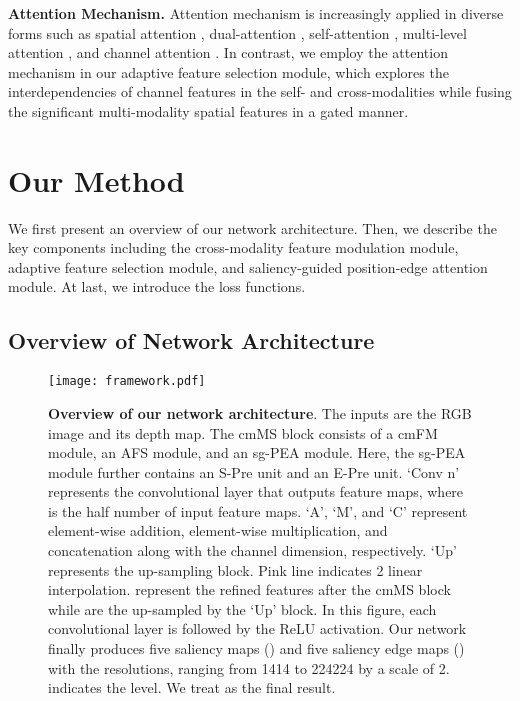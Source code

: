 \documentclass[runningheads]{llncs}
\begin{document}
\noindent
\textbf{Attention Mechanism.}
Attention mechanism is increasingly applied in diverse forms such as spatial attention \cite{Spattention}, dual-attention \cite{DualAttention}, self-attention  \cite{Attention17}, multi-level attention \cite{MultiAttention}, and channel attention \cite{ChannelAttention}.
In contrast, we employ the attention mechanism in our adaptive feature selection module, which explores the interdependencies of channel features in the self- and cross-modalities while fusing the significant multi-modality spatial features in a gated manner.





\section{Our Method}
We first present an overview of our network architecture. Then, we describe the key components including the cross-modality feature modulation module, adaptive feature selection module, and saliency-guided position-edge attention module. At last, we introduce the loss functions.


\subsection{Overview of Network Architecture }

\begin{figure*}[!t]
	\centering
	\texttt{[image: framework.pdf]}
	\caption{\textbf{Overview of our network architecture}. The inputs are the RGB image and its depth map. The cmMS block consists of a cmFM module, an AFS module, and an sg-PEA module. Here, the sg-PEA module further contains an S-Pre unit and an E-Pre unit. `Conv n' represents the convolutional layer that outputs  feature maps, where  is the half number of input feature maps.  `A', `M', and `C' represent element-wise addition, element-wise multiplication, and concatenation along with the channel dimension, respectively. `Up' represents the up-sampling block. Pink line indicates 2 linear interpolation.  represent the refined features after the cmMS block while   are the up-sampled  by the `Up' block.  In this figure, each convolutional layer is followed by the ReLU activation. Our network finally produces five saliency maps () and five saliency edge maps () with the resolutions, ranging from 1414 to 224224 by a scale of 2.  indicates the level. We treat  as the final result.}
	\label{framework}
\end{figure*}
\end{document}
